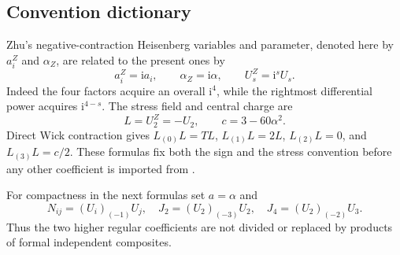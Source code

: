 \subsection{Convention dictionary}
Zhu's negative-contraction Heisenberg variables and parameter, denoted here by $a_i^Z$ and $\alpha_Z$, are related to the present ones by
\begin{equation}\label{w4d:eq:dictionary}
 a_i^Z=\mathrm i a_i,\qquad \alpha_Z=\mathrm i\alpha,
 \qquad U_s^Z=\mathrm i^sU_s.
\end{equation}
Indeed the four factors acquire an overall $\mathrm i^4$, while the rightmost differential power acquires $\mathrm i^{4-s}$. The stress field and central charge are
\begin{equation}\label{w4d:eq:stress}
 L=U_2^Z=-U_2,\qquad c=3-60\alpha^2.
\end{equation}
Direct Wick contraction gives $L_{(0)}L=TL$, $L_{(1)}L=2L$, $L_{(2)}L=0$, and $L_{(3)}L=c/2$. These formulas fix both the sign and the stress convention before any other coefficient is imported from \cite{w4d:Zhu}.

For compactness in the next formulas set $a=\alpha$ and
\[
 N_{ij}=(U_i)_{(-1)}U_j,\quad
 J_2=(U_2)_{(-3)}U_2,\quad J_4=(U_2)_{(-2)}U_3.
\]
Thus the two higher regular coefficients are not divided or replaced by products of formal independent composites.

